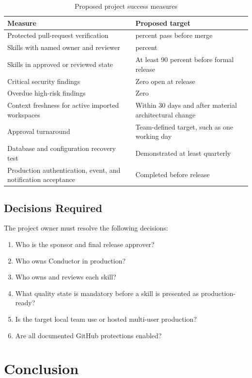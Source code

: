 \documentclass[12pt]{report}
\begin{document}
\begin{table}[hbt!]
\centering
\small
\begin{tabularx}{\textwidth}{X>{\raggedleft\arraybackslash}p{}}
\toprule
Measure & Proposed target \\
\midrule
Protected pull-request verification & 100 percent pass before merge \\
Skills with named owner and reviewer & 100 percent \\
Skills in approved or reviewed state & At least 90 percent before formal release \\
Critical security findings & Zero open at release \\
Overdue high-risk findings & Zero \\
Context freshness for active imported workspaces & Within 30 days and after material architectural change \\
Approval turnaround & Team-defined target, such as one working day \\
Database and configuration recovery test & Demonstrated at least quarterly \\
Production authentication, event, and notification acceptance & Completed before release \\
\bottomrule
\end{tabularx}
\caption{Proposed project success measures}
\label{tab:success-measures}
\end{table}

\section{Decisions Required}

The project owner must resolve the following decisions:

\begin{enumerate}
  \item Who is the sponsor and final release approver?
  \item Who owns Conductor in production?
  \item Who owns and reviews each skill?
  \item What quality state is mandatory before a skill is presented as production-ready?
  \item Is the target local team use or hosted multi-user production?
  \item Are all documented GitHub protections enabled?
\end{enumerate}

\chapter{Conclusion}
\end{document}
